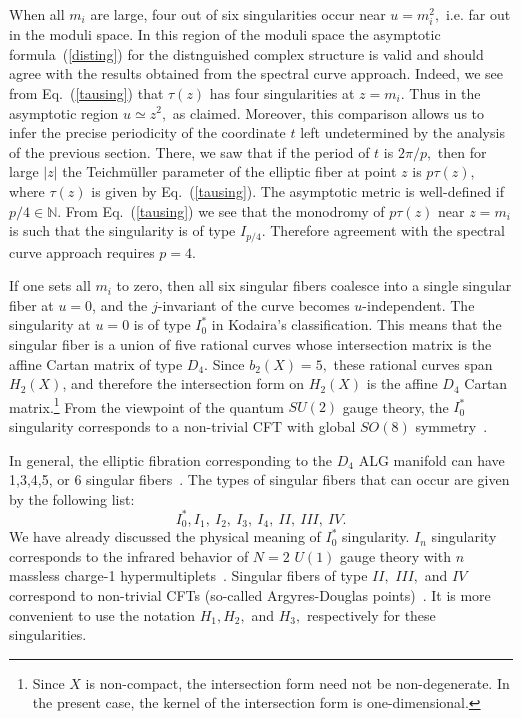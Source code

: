 \documentclass[a4paper,12pt, amsfonts, amssymb]{article}
\newcommand{\NN}{{\mathbb N}}
\begin{document}
When all $m_i$ are large, four out of six singularities occur
near $u=m_i^2,$ i.e. far out in the moduli space. In this region of
the moduli space the asymptotic formula~(\ref{disting}) for the distnguished
complex structure is valid and should agree with the results obtained
from the spectral curve approach. Indeed, we see from Eq.~(\ref{tausing})
that $\tau(z)$ has four singularities at $z=m_i.$ Thus in the
asymptotic region $u\simeq z^2,$ as claimed. Moreover, this comparison
allows us to infer the precise
periodicity of the coordinate $t$ left undetermined by the analysis of the
previous section. There, we saw that if the period of $t$ is $2\pi/p,$
then for large $|z|$ the Teichm\"uller parameter of the elliptic fiber at point $z$ is $p\tau(z),$ where $\tau(z)$ is given by
Eq.~(\ref{tausing}). The asymptotic metric is well-defined if
$p/4\in\NN.$ From Eq.~(\ref{tausing}) we see that the monodromy of
$p\tau(z)$ near $z=m_i$ is such that the singularity is
of type $I_{p/4}.$
Therefore agreement with the spectral curve approach requires $p=4.$

If one sets all $m_i$ to zero,
then all six singular fibers coalesce into a single singular fiber
at $u=0$, and the $j$-invariant of the curve becomes $u$-independent. The singularity at $u=0$ is of type
$I_0^*$ in Kodaira's classification. This means
that the singular fiber is a union of five rational curves whose intersection
matrix is the affine Cartan matrix of type $D_4.$ Since $b_2(X)=5,$
these rational curves span $H_2(X)$, and therefore the
intersection form on $H_2(X)$ is the affine $D_4$ Cartan
matrix.\footnote{Since $X$ is non-compact, the intersection form need
not be non-degenerate. In the present case, the kernel of the intersection form is one-dimensional.} From the viewpoint of the quantum $SU(2)$ gauge theory, the $I_0^*$
singularity corresponds to a non-trivial CFT with global
$SO(8)$ symmetry~\cite{SW2}.


In general, the elliptic fibration corresponding to the $D_4$ ALG manifold
can have 1,3,4,5, or 6 singular fibers~\cite{SW2,APSW}. The types of singular
fibers that can occur are given by the following list:
$$
I_0^*, I_1,\ I_2,\ I_3,\ I_4,\ II,\ III,\ IV.
$$
We have already discussed the physical meaning of $I_0^*$
singularity. $I_n$ singularity corresponds to the infrared behavior
of $N=2$ $U(1)$ gauge theory with $n$ massless charge-1
hypermultiplets~\cite{SW2}. Singular fibers of type $II,$ $III,$ and $IV$ correspond to non-trivial CFTs (so-called Argyres-Douglas points)~\cite{APSW}.
It is more convenient to use the notation $H_1,H_2,$ and
$H_3,$ respectively for these singularities.
\end{document}
